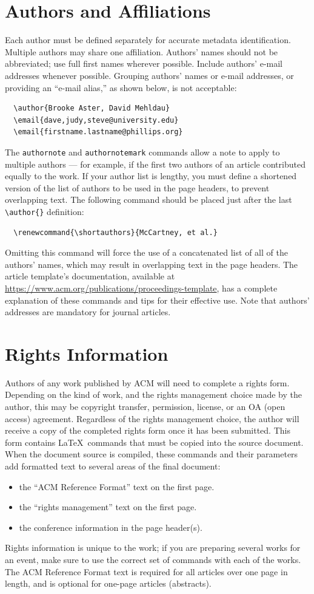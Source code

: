\documentclass[sigplan,screen]{acmart}
\begin{document}
\section{Authors and Affiliations}
Each author must be defined separately for accurate metadata
identification. Multiple authors may share one affiliation. Authors'
names should not be abbreviated; use full first names wherever
possible. Include authors' e-mail addresses whenever possible.
Grouping authors' names or e-mail addresses, or providing an ``e-mail
alias,'' as shown below, is not acceptable:
\begin{verbatim}
  \author{Brooke Aster, David Mehldau}
  \email{dave,judy,steve@university.edu}
  \email{firstname.lastname@phillips.org}
\end{verbatim}
The \verb|authornote| and \verb|authornotemark| commands allow a note
to apply to multiple authors --- for example, if the first two authors
of an article contributed equally to the work.
If your author list is lengthy, you must define a shortened version of
the list of authors to be used in the page headers, to prevent
overlapping text. The following command should be placed just after
the last \verb|\author{}| definition:
\begin{verbatim}
  \renewcommand{\shortauthors}{McCartney, et al.}
\end{verbatim}
Omitting this command will force the use of a concatenated list of all
of the authors' names, which may result in overlapping text in the
page headers.
The article template's documentation, available at
\url{https://www.acm.org/publications/proceedings-template}, has a
complete explanation of these commands and tips for their effective
use.
Note that authors' addresses are mandatory for journal articles.
\section{Rights Information}
Authors of any work published by ACM will need to complete a rights
form. Depending on the kind of work, and the rights management choice
made by the author, this may be copyright transfer, permission,
license, or an OA (open access) agreement.
Regardless of the rights management choice, the author will receive a
copy of the completed rights form once it has been submitted. This
form contains \LaTeX\ commands that must be copied into the source
document. When the document source is compiled, these commands and
their parameters add formatted text to several areas of the final
document:
\begin{itemize}
	\item the ``ACM Reference Format'' text on the first page.
	\item the ``rights management'' text on the first page.
	\item the conference information in the page header(s).
\end{itemize}
Rights information is unique to the work; if you are preparing several
works for an event, make sure to use the correct set of commands with
each of the works.
The ACM Reference Format text is required for all articles over one
page in length, and is optional for one-page articles (abstracts).
\end{document}
